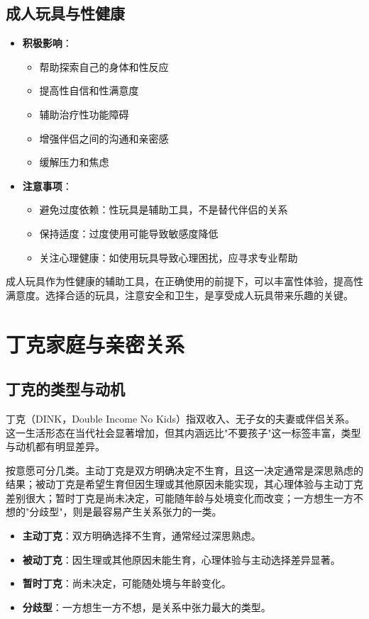 \documentclass[12pt,UTF8]{ctexbook}
\newcommand{\keyword}[1]{\textbf{#1}}
\begin{document}
\subsection{成人玩具与性健康}

\begin{itemize}
	\item \textbf{积极影响}：
	\begin{itemize}
		\item 帮助探索自己的身体和性反应
		\item 提高性自信和性满意度
		\item 辅助治疗性功能障碍
		\item 增强伴侣之间的沟通和亲密感
		\item 缓解压力和焦虑
	\end{itemize}
	\item \textbf{注意事项}：
	\begin{itemize}
		\item 避免过度依赖：性玩具是辅助工具，不是替代伴侣的关系
		\item 保持适度：过度使用可能导致敏感度降低
		\item 关注心理健康：如使用玩具导致心理困扰，应寻求专业帮助
	\end{itemize}
\end{itemize}

成人玩具作为性健康的辅助工具，在正确使用的前提下，可以丰富性体验，提高性满意度。选择合适的玩具，注意安全和卫生，是享受成人玩具带来乐趣的关键。

\backmatter

\section{丁克家庭与亲密关系}
\subsection{丁克的类型与动机}

丁克（DINK，Double Income No Kids）指双收入、无子女的夫妻或伴侣关系。这一生活形态在当代社会显著增加，但其内涵远比"不要孩子"这一标签丰富，类型与动机都有明显差异。

按意愿可分几类。主动丁克是双方明确决定不生育，且这一决定通常是深思熟虑的结果；被动丁克是希望生育但因生理或其他原因未能实现，其心理体验与主动丁克差别很大；暂时丁克是尚未决定，可能随年龄与处境变化而改变；一方想生一方不想的"分歧型"，则是最容易产生关系张力的一类。

\begin{itemize}
	\item \keyword{主动丁克}：双方明确选择不生育，通常经过深思熟虑。
	\item \keyword{被动丁克}：因生理或其他原因未能生育，心理体验与主动选择差异显著。
	\item \keyword{暂时丁克}：尚未决定，可能随处境与年龄变化。
	\item \keyword{分歧型}：一方想生一方不想，是关系中张力最大的类型。
\end{itemize}
\end{document}
